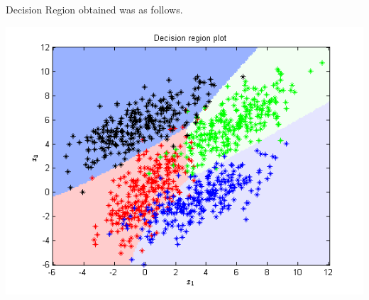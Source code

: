 \documentclass{article}
\begin{document}
Decision Region obtained was as follows.
\begin{center}
\includegraphics[scale=1]{Classification/1c/c_poly/dec}
\end{center}
\end{document}
